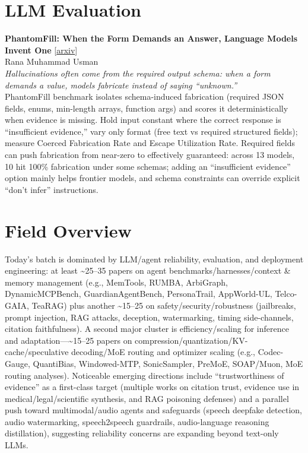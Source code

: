 \documentclass[12pt,letterpaper]{article}
\begin{document}
\medskip


\section*{LLM Evaluation}

{\small\textbf{PhantomFill: When the Form Demands an Answer, Language Models Invent One}} {\scriptsize[\href{https://arxiv.org/abs/2607.20492}{arxiv}]}\\
{\scriptsize Rana Muhammad Usman}\\

{\small\textit{Hallucinations often come from the required output schema: when a form demands a value, models fabricate instead of saying ``unknown.''}}\\[1pt]
{\footnotesize PhantomFill benchmark isolates schema-induced fabrication (required JSON fields, enums, min-length arrays, function args) and scores it deterministically when evidence is missing. Hold input constant where the correct response is ``insufficient evidence,'' vary only format (free text vs required structured fields); measure Coerced Fabrication Rate and Escape Utilization Rate. Required fields can push fabrication from near-zero to effectively guaranteed: across 13 models, 10 hit 100\% fabrication under some schemas; adding an ``insufficient evidence'' option mainly helps frontier models, and schema constraints can override explicit ``don't infer'' instructions.}

\medskip



\section*{Field Overview}
{\footnotesize Today's batch is dominated by LLM/agent reliability, evaluation, and deployment engineering: at least \textasciitilde{}25--35 papers on agent benchmarks/harnesses/context \& memory management (e.g., MemTools, RUMBA, ArbiGraph, DynamicMCPBench, GuardianAgentBench, PersonaTrail, AppWorld-UL, Telco-GAIA, TeaRAG) plus another \textasciitilde{}15--25 on safety/security/robustness (jailbreaks, prompt injection, RAG attacks, deception, watermarking, timing side-channels, citation faithfulness). A second major cluster is efficiency/scaling for inference and adaptation---\textasciitilde{}15--25 papers on compression/quantization/KV-cache/speculative decoding/MoE routing and optimizer scaling (e.g., Codec-Gauge, QuantiBias, Windowed-MTP, SonicSampler, PreMoE, SOAP/Muon, MoE routing analyses). Noticeable emerging directions include ``trustworthiness of evidence'' as a first-class target (multiple works on citation trust, evidence use in medical/legal/scientific synthesis, and RAG poisoning defenses) and a parallel push toward multimodal/audio agents and safeguards (speech deepfake detection, audio watermarking, speech2speech guardrails, audio-language reasoning distillation), suggesting reliability concerns are expanding beyond text-only LLMs.}
\end{document}
